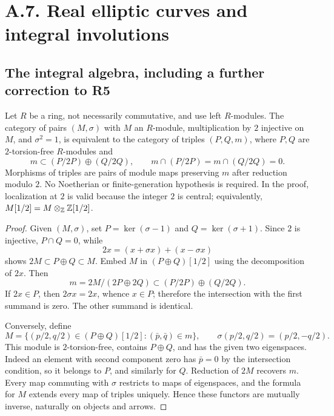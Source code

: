 \section{A.7. Real elliptic curves and integral involutions}
\subsection{The integral algebra, including a further correction to R5}

\begin{proposition}\label{A7-gluing-modules}
Let $R$ be a ring, not necessarily commutative, and use left $R$-modules. The category of pairs $(M,\sigma)$ with $M$ an $R$-module, multiplication by $2$ injective on $M$, and $\sigma^2=1$, is equivalent to the category of triples $(P,Q,m)$, where $P,Q$ are $2$-torsion-free $R$-modules and
\[
 m\subset(P/2P)\oplus(Q/2Q),\qquad
 m\cap(P/2P)=m\cap(Q/2Q)=0.
\]
Morphisms of triples are pairs of module maps preserving $m$ after reduction modulo $2$. No Noetherian or finite-generation hypothesis is required. In the proof, localization at $2$ is valid because the integer $2$ is central; equivalently, $M[1/2]=M\otimes_{{\mathbb{Z}}}{\mathbb{Z}}[1/2]$.
\end{proposition}
\begin{proof}
Given $(M,\sigma)$, set $P=\ker(\sigma-1)$ and $Q=\ker(\sigma+1)$. Since $2$ is injective, $P\cap Q=0$, while
\[
 2x=(x+\sigma x)+(x-\sigma x)
\]
shows $2M\subset P\oplus Q\subset M$. Embed $M$ in $(P\oplus Q)[1/2]$ using the decomposition of $2x$. Then
\[
 m=2M/(2P\oplus2Q)\subset(P/2P)\oplus(Q/2Q).
\]
If $2x\in P$, then $2\sigma x=2x$, whence $x\in P$; therefore the intersection with the first summand is zero. The other summand is identical.

Conversely, define
\[
 M=\{(p/2,q/2)\in(P\oplus Q)[1/2]:
                (\bar{p},\bar{q})\in m\},
 \qquad \sigma(p/2,q/2)=(p/2,-q/2).
\]
This module is $2$-torsion-free, contains $P\oplus Q$, and has the given two eigenspaces. Indeed an element with second component zero has $\bar{p}=0$ by the intersection condition, so it belongs to $P$, and similarly for $Q$. Reduction of $2M$ recovers $m$. Every map commuting with $\sigma$ restricts to maps of eigenspaces, and the formula for $M$ extends every map of triples uniquely. Hence these functors are mutually inverse, naturally on objects and arrows.
\end{proof}

